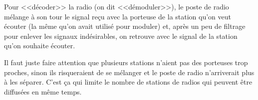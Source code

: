 \documentclass{article}
\begin{document}
Pour <<décoder>> la radio (on dit <<démoduler>>), le poste de radio mélange à son tour le signal reçu avec la porteuse de la station qu'on veut écouter (la même qu'on avait utilisé pour moduler) et, après un peu de filtrage pour enlever les signaux indésirables, on retrouve avec le signal de la station qu'on souhaite écouter.

Il faut juste faire attention que plusieurs stations n'aient pas des porteuses trop proches, sinon ils risqueraient de se mélanger et le poste de radio n'arriverait plus à les séparer. C'est ça qui limite le nombre de stations de radios qui peuvent être diffusées en même temps.
\end{document}
